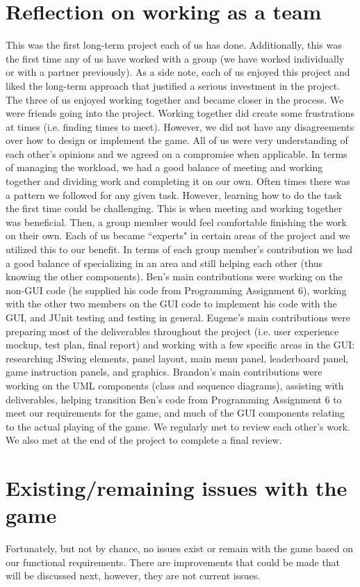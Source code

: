 \documentclass[]{report}   %
\begin{document}
\section{Reflection on working as a team}     %
This was the first long-term project each of us has done. Additionally, this was the first time any of us have worked with a group (we have worked individually or with a partner previously). As a side note, each of us enjoyed this project and liked the long-term approach that justified a serious investment in the project. The three of us enjoyed working together and became closer in the process. We were friends going into the project. Working together did create some frustrations at times (i.e. finding times to meet). However, we did not have any disagreements over how to design or implement the game. All of us were very understanding of each other's opinions and we agreed on a compromise when applicable. In terms of managing the workload, we had a good balance of meeting and working together and dividing work and completing it on our own. Often times there was a pattern we followed for any given task. However, learning how to do the task the first time could be challenging. This is when meeting and working together was beneficial. Then, a group member would feel comfortable finishing the work on their own. Each of us became ``experts" in certain areas of the project and we utilized this to our benefit. In terms of each group member's contribution we had a good balance of specializing in an area and still helping each other (thus knowing the other components). Ben's main contributions were working on the non-GUI code (he supplied his code from Programming Assignment 6), working with the other two members on the GUI code to implement his code with the GUI, and JUnit testing and testing in general. Eugene's main contributions were preparing most of the deliverables throughout the project (i.e. user experience mockup, test plan, final report) and working with a few specific areas in the GUI: researching JSwing elements, panel layout, main menu panel, leaderboard panel, game instruction panels, and graphics. Brandon's main contributions were working on the UML components (class and sequence diagrams), assisting with deliverables, helping transition Ben's code from Programming Assignment 6 to meet our requirements for the game, and much of the GUI components relating to the actual playing of the game. We regularly met to review each other's work. We also met at the end of the project to complete a final review.
\section{Existing/remaining issues with the game}     %
Fortunately, but not by chance, no issues exist or remain with the game based on our functional requirements. There are improvements that could be made that will be discussed next, however, they are not current issues.
\end{document}
